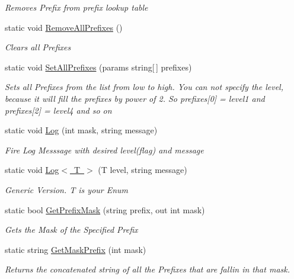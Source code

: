 \begin{DoxyCompactItemize}
\begin{DoxyCompactList}\small\item\em Removes Prefix from prefix lookup table \end{DoxyCompactList}\item 
static void \mbox{\hyperlink{class_a_d_l_1_1_debug_a55a298962d5f05d55c5b3b045e7f6fe7}{Remove\+All\+Prefixes}} ()
\begin{DoxyCompactList}\small\item\em Clears all Prefixes \end{DoxyCompactList}\item 
static void \mbox{\hyperlink{class_a_d_l_1_1_debug_aeee052b6bc6759222ce6ed32dd9763a1}{Set\+All\+Prefixes}} (params string\mbox{[}$\,$\mbox{]} prefixes)
\begin{DoxyCompactList}\small\item\em Sets all Prefixes from the list from low to high. You can not specify the level, because it will fill the prefixes by power of 2. So prefixes\mbox{[}0\mbox{]} = level1 and prefixes\mbox{[}2\mbox{]} = level4 and so on \end{DoxyCompactList}\item 
static void \mbox{\hyperlink{class_a_d_l_1_1_debug_a169452dbed965a360a23e112ed9956c3}{Log}} (int mask, string message)
\begin{DoxyCompactList}\small\item\em Fire Log Messsage with desired level(flag) and message \end{DoxyCompactList}\item 
static void \mbox{\hyperlink{class_a_d_l_1_1_debug_a4162ccb62b2facbc5ab9f981abe6fa3e}{Log$<$ T $>$}} (T level, string message)
\begin{DoxyCompactList}\small\item\em Generic Version. T is your Enum \end{DoxyCompactList}\item 
static bool \mbox{\hyperlink{class_a_d_l_1_1_debug_a2fe51aa97328f57e590d03a93d774b80}{Get\+Prefix\+Mask}} (string prefix, out int mask)
\begin{DoxyCompactList}\small\item\em Gets the Mask of the Specified Prefix \end{DoxyCompactList}\item 
static string \mbox{\hyperlink{class_a_d_l_1_1_debug_ab0b0f7207f13fd82d9c37a3b6a564e1c}{Get\+Mask\+Prefix}} (int mask)
\begin{DoxyCompactList}\small\item\em Returns the concatenated string of all the Prefixes that are fallin in that mask. \end{DoxyCompactList}\end{DoxyCompactItemize}
